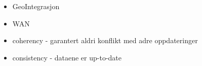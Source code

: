 












\begin{itemize}
	\item GeoIntegrasjon
	\item \cite{Breslow2004} WAN
	\item coherency - garantert aldri konflikt med adre oppdateringer
	\item consistency - dataene er up-to-date
\end{itemize}

